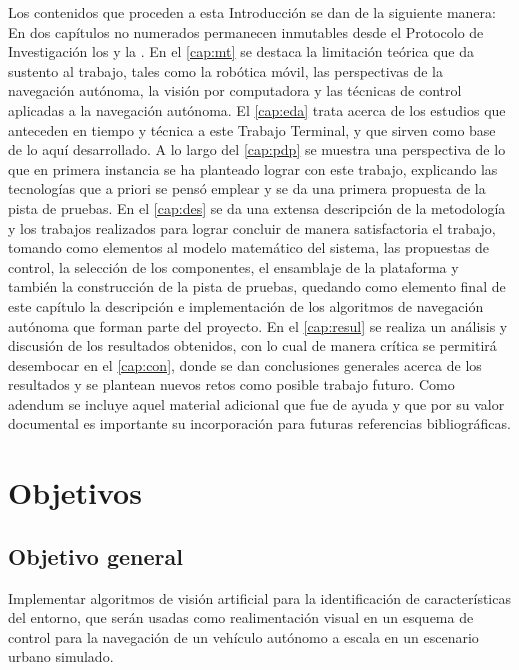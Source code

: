 \documentclass[12pt, letterpaper, oneside]{book}
\newcommand*{\unnref}[1]{\hyperref[{#1}]{\nameref*{#1}}}
\begin{document}
	\par Los contenidos que proceden a esta Introducción se dan de la siguiente manera: En dos capítulos no numerados permanecen inmutables desde el Protocolo de Investigación los \unnref{cap:obj} y la \unnref{cap:jus}. En el \autoref{cap:mt} se destaca la limitación teórica que da sustento al trabajo, tales como la robótica móvil, las perspectivas de la navegación autónoma, la visión por computadora y las técnicas de control aplicadas a la navegación autónoma. El \autoref{cap:eda} trata acerca de los estudios que anteceden en tiempo y técnica a este Trabajo Terminal, y que sirven como base de lo aquí desarrollado. A lo largo del \autoref{cap:pdp} se muestra una perspectiva de lo que en primera instancia se ha planteado  lograr con este trabajo, explicando las tecnologías que a priori se pensó emplear y se da una primera propuesta de la pista de pruebas. En el \autoref{cap:des} se da una extensa descripción de la metodología y los trabajos realizados para lograr concluir de manera satisfactoria el trabajo, tomando como elementos al modelo matemático del sistema, las propuestas de control, la selección de los componentes, el ensamblaje de la plataforma y también la construcción de la pista de pruebas, quedando como elemento final de este capítulo la descripción e implementación de los algoritmos de navegación autónoma que forman parte del proyecto. En el \autoref{cap:resul} se realiza un análisis y discusión de los resultados obtenidos, con lo cual de manera crítica se permitirá desembocar en el \autoref{cap:con}, donde se dan conclusiones generales acerca de los resultados y se plantean nuevos retos como posible trabajo futuro. Como adendum se incluye aquel material adicional que fue de ayuda y que por su valor documental es importante su incorporación para futuras referencias bibliográficas.
	\chapter*{Objetivos}
	\label{cap:obj}
	\section*{Objetivo general}
	\label{sec:objg}
	Implementar algoritmos de visión artificial para la identificación de características del entorno, que serán usadas como realimentación visual en un esquema de control para la navegación de un vehículo autónomo a escala en un escenario urbano simulado.
\end{document}
